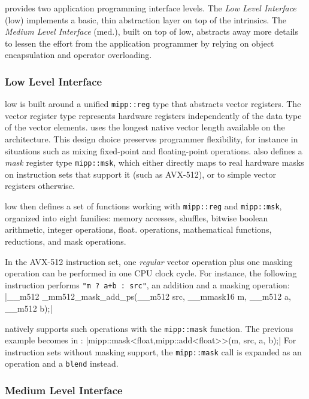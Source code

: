 \MIPP provides two application programming interface levels. The
\emph{Low Level Interface} (low) implements a basic, thin abstraction layer on
top of the intrinsics. The \emph{Medium Level Interface} (med.), built on top of
\MIPP low, abstracts away more details to lessen the effort from the application
programmer by relying on object encapsulation and operator overloading.

\subsubsection{Low Level Interface}

\MIPP low is built around a unified \verb|mipp::reg| type that abstracts vector
registers. The vector register type represents hardware registers independently
of the data type of the vector elements. \MIPP uses the longest native vector
length available on the architecture. This design choice preserves programmer
flexibility, for instance in situations such as mixing fixed-point and
floating-point operations. \MIPP also defines a \emph{mask} register type
\verb|mipp::msk|, which either directly maps to real hardware masks on
instruction sets that support it (such as AVX-512), or to simple vector
registers otherwise.

\MIPP low then defines a set of functions working with \verb|mipp::reg| and
\verb|mipp::msk|, organized into eight families: memory accesses, shuffles,
bitwise boolean arithmetic, integer operations, float. operations, mathematical
functions, reductions, and mask operations.

In the AVX-512 instruction set, one \textit{regular} vector operation plus one
masking operation can be performed in one CPU clock cycle. For instance, the
following instruction performs \verb|"m ? a+b : src"|, an addition and a masking
operation:
|__m512 _mm512_mask_add_ps(__m512 src, __mmask16 m, __m512 a, __m512 b);|

\MIPP natively supports such operations with the \verb|mipp::mask| function. The
previous example becomes in \MIPP:
|mipp::mask<float,mipp::add<float>>(m, src, a, b);|
For instruction sets without masking support, the \verb|mipp::mask| call is
expanded as an operation and a \verb|blend| instead.

\subsubsection{Medium Level Interface}

